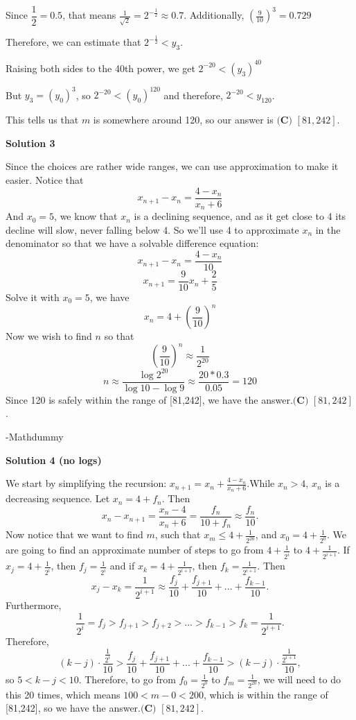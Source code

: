 \begin{enumerate}
 
Since $\dfrac{1}{2}=0.5$, that means $\frac{1}{\sqrt{2}}=2^{-\frac{1}{2}} \approx 0.7$. Additionally, $\left(\frac{9}{10}\right)^3=0.729$

 
Therefore, we can estimate that $2^{-\frac{1}{2}} < y_3$.

 Raising both sides to the 40th power, we get $2^{-20} < (y_3)^{40}$

 But $y_3 = (y_0)^3$, so $2^{-20} < (y_0)^{120}$ and therefore, $2^{-20} < y_{120}$.

 This tells us that $m$ is somewhere around 120, so our answer is $\boxed{\textbf{(C) } [81,242]}$.

 



\textbf{Solution 3}

Since the choices are rather wide ranges, we can use approximation to make it easier. Notice that
 \[x_{n+1} - x_n = \frac{4-x_n}{x_n+6}\]And $x_0 =5$, we know that $x_n$ is a declining sequence, and as it get close to 4 its decline will slow, never falling below 4. So we'll use 4 to approximate $x_n$ in the denominator so that we have a solvable difference equation:
 \[x_{n+1} - x_n = \frac{4-x_n}{10}\]
 \[x_{n+1} = \frac{9}{10}x_n + \frac{2}{5}\]Solve it with $x_0 = 5$, we have
 \[x_n = 4 + (\frac{9}{10})^n\]Now we wish to find $n$ so that
 \[(\frac{9}{10})^n \approx \frac{1}{2^{20}}\]
 \[n \approx \frac{\log{2^{20}}}{\log{10}-\log9} \approx \frac{20*0.3}{0.05} = 120\]Since 120 is safely within the range of [81,242], we have the answer.$\boxed{\textbf{(C) } [81,242]}$.

 -Mathdummy

 



\textbf{Solution 4 (no logs)}

We start by simplifying the recursion: $x_{n+1} = x_n + \frac{4-x_n}{x_n+6}$.While $x_n > 4$, $x_n$ is a decreasing sequence. Let $x_n = 4 + f_n$. Then 
 \[x_{n} - x_{n+1} = \frac{x_n-4}{x_n+6} = \frac{f_n}{10 + f_n} \approx \frac{f_n}{10}.\]Now notice that we want to find $m$, such that $x_m \leq 4 + \frac{1}{2^{20}}$, and $x_0 = 4 + \frac{1}{2^0}$. We are going to find an approximate number of steps to go from $4 + \frac{1}{2^i}$ to $4 + \frac{1}{2^{i+1}}$. If $x_j = 4 + \frac{1}{2^i}$, then $f_j = \frac{1}{2^i}$ and if $x_k = 4 + \frac{1}{2^{i+1}}$, then $f_k = \frac{1}{2^{i+1}}$. Then 
 \[x_j - x_k = \frac{1}{2^{i+1}} \approx \frac{f_j}{10} + \frac{f_{j+1}}{10} + ... + \frac{f_{k-1}}{10}.\]Furthermore, 
 \[\frac{1}{2^i} = f_j > f_{j+1} > f_{j+2} > ... > f_{k-1} > f_k = \frac{1}{2^{i+1}}.\] Therefore, 
 \[(k-j) \cdot \frac{\frac{1}{2^i}}{10} > \frac{f_j}{10} + \frac{f_{j+1}}{10} + ... + \frac{f_{k-1}}{10} > (k-j) \cdot \frac{\frac{1}{2^{i+1}}}{10},\] so $5 < k-j < 10$. Therefore, to go from $f_0 = \frac{1}{2^0}$ to $f_m = \frac{1}{2^{20}}$, we will need to do this 20 times, which means $100 < m - 0 < 200$, which is within the range of [81,242], so we have the answer.$\boxed{\textbf{(C) } [81,242]}$.


\end{enumerate}

